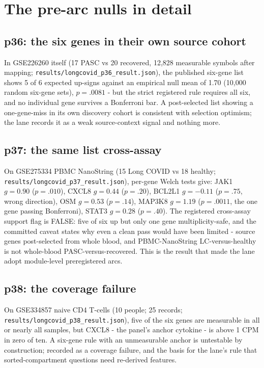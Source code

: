\documentclass[11pt,a4paper]{article}
\begin{document}
\section{The pre-arc nulls in detail}
\subsection{p36: the six genes in their own source cohort}
In GSE226260 itself (17 PASC vs 20 recovered, 12{,}828 measurable symbols
after mapping; \texttt{results/longcovid\_p36\_result.json}), the published
six-gene list shows 5 of 6 expected up-signs against an empirical null mean
of 1.70 (10{,}000 random six-gene sets), $p=.0081$ - but
the strict registered rule requires all six, and no individual gene survives
a Bonferroni bar. A post-selected list showing a one-gene-miss in its own
discovery cohort is consistent with selection optimism; the lane
records it as a weak source-context signal and nothing more.

\subsection{p37: the same list cross-assay}
On GSE275334 PBMC NanoString (15 Long COVID vs 18 healthy;
\texttt{results/longcovid\_p37\_result.json}), per-gene Welch tests give:
JAK1 $g=0.90$ ($p=.010$), CXCL8 $g=0.44$ ($p=.20$), BCL2L1 $g=-0.11$
($p=.75$, wrong direction), OSM $g=0.53$ ($p=.14$), MAP3K8 $g=1.19$
($p=.0011$, the one gene passing Bonferroni), STAT3 $g=0.28$ ($p=.40$). The
registered cross-assay support flag is FALSE: five of six up but only one
gene multiplicity-safe, and the committed caveat states why even a clean pass
would have been limited - source genes post-selected from whole blood, and
PBMC-NanoString LC-versus-healthy is not whole-blood PASC-versus-recovered.
This is the result that made the lane adopt module-level preregistered arcs.

\subsection{p38: the coverage failure}
On GSE334857 naive CD4 T-cells (10 people; 25 records;
\texttt{results/longcovid\_p38\_result.json}), five of the six genes are
measurable in all or nearly all samples, but CXCL8 - the panel's anchor
cytokine - is above 1 CPM in zero of ten. A six-gene rule with an
unmeasurable anchor is untestable by construction; recorded as a coverage
failure, and the basis for the lane's rule that sorted-compartment questions
need re-derived features.
\end{document}
